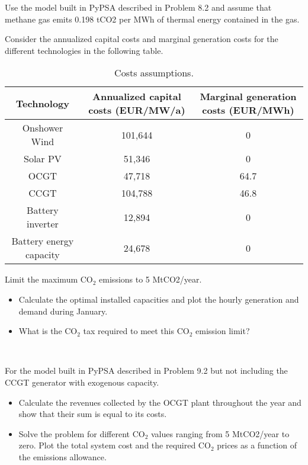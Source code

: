 \documentclass[10pt]{article}
\newenvironment{problem}[2][Problem]{\begin{trivlist}
\item[\hskip \labelsep {\bfseries #1}\hskip \labelsep {\bfseries #2.}]}{\end{trivlist}}
\begin{document}
\begin{problem}{9.2}
Use the model built in PyPSA described in Problem 8.2 and assume that methane gas emits 0.198 tCO2 per MWh of thermal energy contained in the gas. 

Consider the annualized capital costs and marginal generation costs for the different technologies in the following table.

\begin{table}[h]
    \centering
    \begin{tabular}{|c|c|c|}
    \hline
        Technology & Annualized capital costs (EUR/MW/a) & Marginal generation costs (EUR/MWh) \\
    \hline
    Onshower Wind &  101,644 & 0 \\
         Solar PV &  51,346 & 0 \\
         OCGT & 47,718 &  64.7  \\
         CCGT & 104,788 &  46.8   \\
         Battery inverter & 12,894  & 0 \\
         Battery energy capacity &  24,678 & 0 \\
    \hline
    \end{tabular}
    \caption{Costs assumptions.}
    \label{tab:my_label}
\end{table}

Limit the maximum CO$_2$ emissions to 5 MtCO2/year. 

\begin{itemize}
\item[a)] Calculate the optimal installed capacities and plot the hourly generation and demand during January.
\item[b)] What is the CO$_2$ tax required to meet this CO$_2$ emission limit?

\end{itemize}

\end{problem}

\

\begin{problem}{9.3}

For the model built in PyPSA described in Problem 9.2 but not including the CCGT generator with exogenous capacity.

\begin{itemize}
\item[a)] Calculate the revenues collected by the OCGT plant throughout the year and show that their sum is equal to its costs.
\item[b)] Solve the problem for different CO$_2$ values ranging from 5 MtCO2/year to zero. Plot the total system cost and the required CO$_2$ prices as a function of the emissions allowance.
\end{itemize}

\end{problem}

\end{document}

